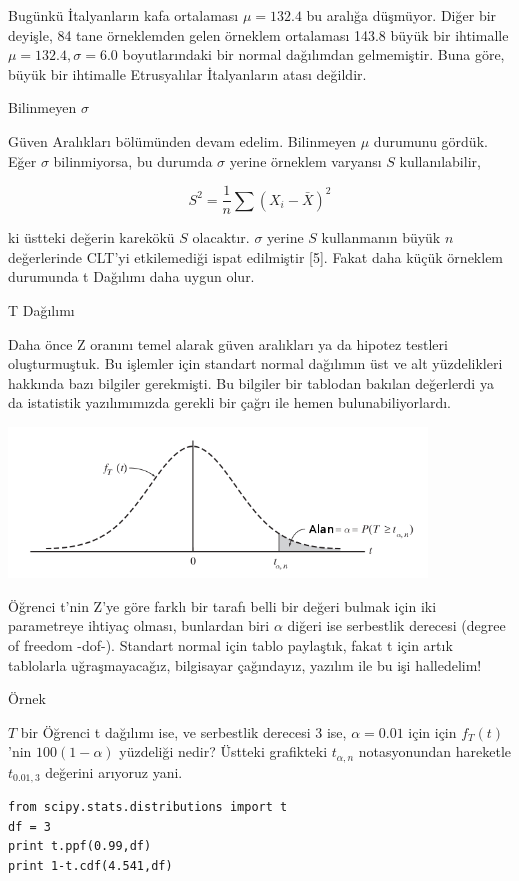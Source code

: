 \documentclass[12pt,fleqn]{article}\usepackage{../../common}
\begin{document}
Bugünkü İtalyanların kafa ortalaması $\mu=132.4$ bu aralığa düşmüyor. Diğer
bir deyişle, 84 tane örneklemden gelen örneklem ortalaması 143.8 büyük bir
ihtimalle $\mu=132.4,\sigma=6.0$ boyutlarındaki bir normal dağılımdan
gelmemiştir. Buna göre, büyük bir ihtimalle Etrusyalılar İtalyanların atası
değildir. 

Bilinmeyen $\sigma$

Güven Aralıkları bölümünden devam edelim. Bilinmeyen $\mu$ durumunu
gördük. Eğer $\sigma$ bilinmiyorsa, bu durumda $\sigma$ yerine örneklem
varyansı $S$ kullanılabilir,

$$ S^2 = \frac{1}{n} \sum (X_i - \bar{X})^2
$$

ki üstteki değerin karekökü $S$ olacaktır. $\sigma$ yerine $S$ kullanmanın 
büyük $n$ değerlerinde CLT'yi etkilemediği ispat edilmiştir [5]. Fakat daha
küçük örneklem durumunda t Dağılımı daha uygun olur. 

T Dağılımı

Daha önce Z oranını temel alarak güven aralıkları ya da hipotez testleri
oluşturmuştuk. Bu işlemler için standart normal dağılımın üst ve alt
yüzdelikleri hakkında bazı bilgiler gerekmişti. Bu bilgiler bir tablodan
bakılan değerlerdi ya da istatistik yazılımımızda gerekli bir çağrı ile
hemen bulunabiliyorlardı.

\includegraphics[height=4cm]{stat_ci_04.png}

Öğrenci t'nin Z'ye göre farklı bir tarafı belli bir değeri bulmak için iki
parametreye ihtiyaç olması, bunlardan biri $\alpha$ diğeri ise serbestlik
derecesi (degree of freedom -dof-). Standart normal için tablo paylaştık,
fakat t için artık tablolarla uğraşmayacağız, bilgisayar çağındayız,
yazılım ile bu işi halledelim! 

Örnek

$T$ bir Öğrenci t dağılımı ise, ve serbestlik derecesi 3 ise, $\alpha=0.01$
için için $f_T(t)$'nin $100(1-\alpha)$ yüzdeliği nedir? Üstteki grafikteki
$t_{\alpha,n}$ notasyonundan hareketle $t_{0.01,3}$ değerini arıyoruz yani.

\begin{verbatim}
from scipy.stats.distributions import t
df = 3
print t.ppf(0.99,df)
print 1-t.cdf(4.541,df)
\end{verbatim}
\end{document}
